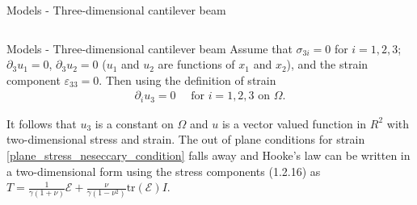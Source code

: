 \documentclass[8pt]{beamer}
\begin{document}
\begin{frame}{Models - Three-dimensional cantilever beam}
\begin{columns}[T]
                \begin{column}{.4\textwidth}
                \end{column}
            \end{columns}
        \end{frame}

        \begin{frame}{Models - Three-dimensional cantilever beam}
            Assume that $\sigma_{3i} = 0$ for $i = 1, 2, 3$; $\partial_3 u_1 = 0$, $\partial_3 u_2 = 0$ ($u_1$ and $u_2$ are functions of $x_1$ and $x_2$), and the strain component $\varepsilon_{33} = 0$. Then using the definition of strain 
            \begin{eqnarray}
                \partial_i u_3 = 0 \quad \textrm{ for } i = 1,2,3 \textrm{ on } \Omega.
            \end{eqnarray}

            It follows that $u_3$ is a constant on $\Omega$ and $u$ is a vector valued function in $R^2$ with two-dimensional stress and strain. The out of plane conditions for strain \eqref{plane_stress_neseccary_condition} falls away and Hooke’s law can be written in a two-dimensional form using the stress components (1.2.16) as $\displaystyle T = \frac{1}{\gamma(1+\nu)}\mathcal{E} + \frac{\nu}{\gamma(1-\nu^2)}\textrm{tr}(\mathcal{E})I.$\\


            
        \end{frame}
\end{document}
